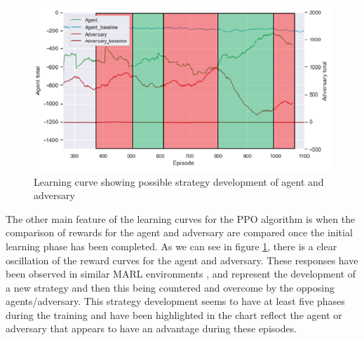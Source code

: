 \documentclass{article}
\begin{document}


\begin{figure}[!ht]
  \centering
  \includegraphics[scale=.7]{strat_development.PNG}
  \caption{Learning curve showing possible strategy development of agent and adversary}
  \label{fig:STRATLEARN}
\end{figure}

The other main feature of the learning curves for the PPO algorithm is when the comparison of rewards for the agent and adversary are compared once the initial learning phase has been completed.
As we can see in figure \ref{fig:STRATLEARN}, there is a clear oscillation of the reward curves for the agent and adversary.
These responses have been observed in similar MARL environments \citep{emergenttoolusage}, and represent the development of a new strategy and then this being countered and overcome by the opposing agents/adversary.
This strategy development seems to have at least five phases during the training and have been highlighted in the chart reflect the agent or adversary that appears to have an advantage during these episodes.
\end{document}
